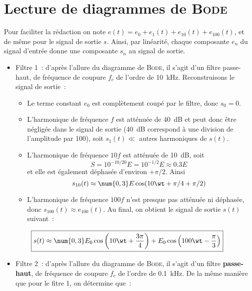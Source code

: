 \documentclass[a4paper, 12pt, final, garamond]{book}
\begin{document}
\section{Lecture de diagrammes de \textsc{Bode}}

Pour faciliter la rédaction on note $e(t) = e_0 + e_1 (t) + e_{10} (t) + e_{100}
(t)$, et de même pour le signal de sortie $s$. Ainsi, par linéarité, chaque
composante $e_n$ du signal d'entrée donne une composante $s_n$ au signal de
sortie.
\begin{itemize}
    \item Filtre 1~: d'après l'allure du diagramme de \textsc{Bode}, il s'agit d'un
        filtre passe-haut, de fréquence de coupure $f_c$ de l'ordre de
        \SI{10}{kHz}. Reconstruisons le signal de sortie~:
        \begin{itemize}
            \item Le terme constant $e_0$ est complètement coupé par le filtre,
                donc $s_0 = 0$.
            \item L'harmonique de fréquence $f$ est atténuée de \SI{40}{dB} et
                peut donc être négligée dans le signal de sortie (\SI{40}{dB}
                correspond à une division de l'amplitude par 100), soit $s_1 (t)
                \ll$ autres harmoniques de $s(t)$.
            \item L'harmonique de fréquence $10f$ est atténuée de \SI{10}{dB},
                soit \[S = 10^{-10/20} E = 10^{-1/2} E \approx \num{0,3}E\] et
                elle est également déphasée d'environ $+\pi/2$. Ainsi \[s_{10}
                (t) \approx \num{0,3}E \cos(10\wt + \pi/4 + \pi/2)\]
            \item L'harmonique de fréquence $100f$ n'est presque pas atténuée ni
                déphasée, donc $s_{100} (t) \approx e_{100} (t)$. Au final, on
                obtient le signal de sortie $s(t)$ suivant~:
        \end{itemize}
\end{itemize}

\[\boxed{
    s(t) \approx
    \num{0,3}E_0 \cos \left(10\wt + \frac{3\pi}{4}\right) +
    E_0 \cos \left(100\wt - \frac{\pi}{3}\right)
}\]

\begin{itemize}
    \item Filtre 2~: d'après l'allure du diagramme de \textsc{Bode}, il s'agit d'un
        filtre \textbf{passe-haut}, de fréquence de coupure $f_c$ de l'ordre de
        \SI{0.1}{kHz}. De la même manière que pour le fitre 1, on détermine que~:
\end{itemize}
\end{document}
